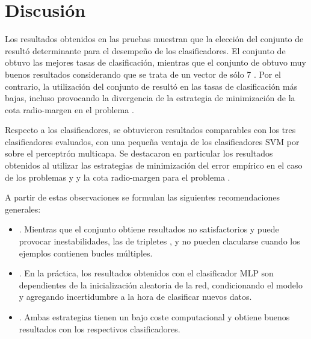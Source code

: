 %
%
%
\section{Discusión}
%
Los resultados obtenidos en las pruebas muestran que la elección del
conjunto de  resultó determinante para el desempeño de los
clasificadores.
El conjunto de   obtuvo las mejores tasas de
clasificación, mientras que el conjunto de   obtuvo
muy buenos resultados considerando que se trata de un vector de sólo 7
.
Por el contrario, la utilización del conjunto de  
resultó en las tasas de clasificación más bajas, incluso provocando la
divergencia de la estrategia de minimización de la cota radio-margen
en el problema \prob\mipred{}.

Respecto a los clasificadores, se obtuvieron resultados comparables
con los tres clasificadores evaluados, con una pequeña ventaja de los
clasificadores SVM por sobre el perceptrón multicapa.
Se destacaron en particular los resultados obtenidos al utilizar las
estrategias de minimización del error empírico en el caso de los
problemas \prob\mipred{} y \prob\micropred{} y la cota radio-margen
para el problema \prob\tripletsvm{}.

A partir de estas observaciones se formulan las siguientes
recomendaciones generales:
%
\begin{itemize}
\item
  .
  Mientras que el conjunto  obtiene resultados no
  satisfactorios y puede provocar inestabilidades, las  de
  tripletes ,  y  no pueden clacularse
  cuando los ejemplos contienen bucles múltiples.
\item 
  .
  En la práctica, los resultados obtenidos con el clasificador MLP son
  dependientes de la inicialización aleatoria de la red, condicionando
  el modelo y agregando incertidumbre a la hora de clasificar nuevos
  datos.
\item
  .
  Ambas estrategias tienen un bajo coste computacional y obtiene
  buenos resultados con los respectivos clasificadores.
\end{itemize}
%
